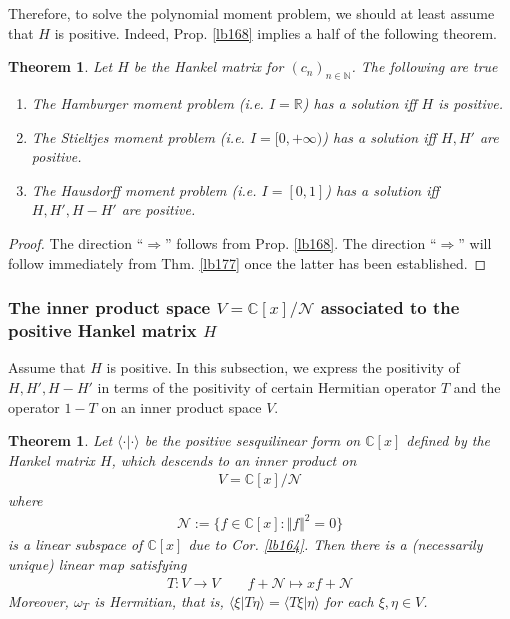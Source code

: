 \documentclass[12pt,b5paper,notitlepage]{article}
\theoremstyle{definition}
\theoremstyle{plain}
\newtheorem{thm}[df]{Theorem}
\newcommand{\bk}[1]{\langle {#1}\rangle}
\newcommand{\scr}{\mathscr}
\newcommand{\Cbb}{\mathbb C}
\newcommand{\Nbb}{\mathbb N}
\newcommand{\Rbb}{\mathbb R}
\numberwithin{equation}{section}
\begin{document}
Therefore, to solve the polynomial moment problem, we should at least assume that $H$ is positive. Indeed, Prop. \ref{lb168} implies a half of the following theorem.
\begin{thm}\label{lb169}
Let $H$ be the Hankel matrix for $(c_n)_{n\in\Nbb}$. The following are true
\begin{enumerate}
\item The Hamburger moment problem (i.e. $I=\Rbb$) has a solution iff $H$ is positive.
\item The Stieltjes moment problem (i.e. $I=[0,+\infty)$) has a solution iff $H,H'$ are positive.
\item The Hausdorff moment problem (i.e. $I=[0,1]$) has a solution iff $H,H',H-H'$ are positive.
\end{enumerate}
\end{thm}






\begin{proof}
The direction ``$\Rightarrow$'' follows from Prop. \ref{lb168}. The direction ``$\Rightarrow$'' will follow immediately from Thm. \ref{lb177} once the latter has been established.
\end{proof}




\subsubsection{The inner product space $V=\Cbb[x]/\scr N$ associated to the positive Hankel matrix $H$}

Assume that $H$ is positive. In this subsection, we express the positivity of $H,H',H-H'$ in terms of the positivity of certain Hermitian operator $T$ and the operator $1-T$ on an inner product space $V$.

\begin{thm}\label{lb167}
Let $\bk{\cdot|\cdot}$ be the positive sesquilinear form on $\Cbb[x]$ defined by the Hankel matrix $H$, which descends to an inner product on
\begin{align*}
V=\Cbb[x]/\scr N
\end{align*}
where
\begin{align*}
\scr N:=\{f\in\Cbb[x]:\Vert f\Vert^2=0\}
\end{align*}
is a linear subspace of $\Cbb[x]$ due to Cor. \ref{lb164}. Then there is a (necessarily unique) linear map satisfying
\begin{gather*}
T:V\rightarrow V\qquad f+\scr N\mapsto xf+\scr N
\end{gather*}
Moreover, $\omega_T$ is Hermitian, that is, $\bk{\xi|T\eta}=\bk{T\xi|\eta}$ for each $\xi,\eta\in V$.
\end{thm}
\end{document}
